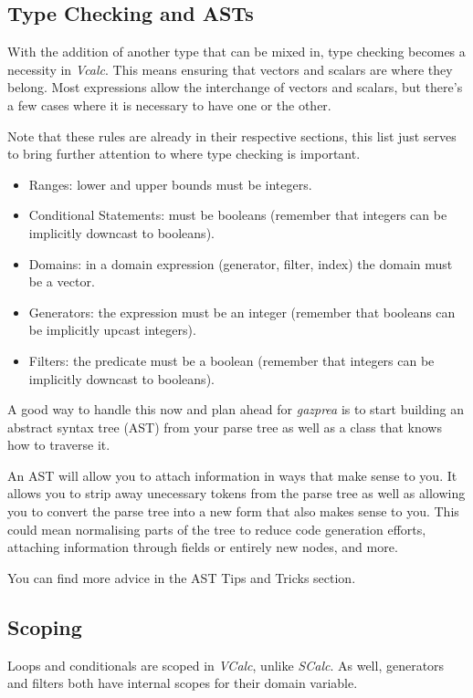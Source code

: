 \documentclass{article}
\begin{document}
\subsection{Type Checking and ASTs}
With the addition of another type that can be mixed in, type checking becomes a necessity in
\textit{Vcalc}. This means ensuring that vectors and scalars are where they belong. Most expressions
allow the interchange of vectors and scalars, but there's a few cases where it is necessary to have
one or the other.

Note that these rules are already in their respective sections, this list just serves to bring
further attention to where type checking is important.

\begin{itemize}
  \item
    Ranges: lower and upper bounds must be integers.
  \item
    Conditional Statements: must be booleans (remember that integers can be implicitly downcast to
    booleans).
  \item
    Domains: in a domain expression (generator, filter, index) the domain must be a vector.
  \item
    Generators: the expression must be an integer (remember that booleans can be implicitly upcast
    integers).
  \item
    Filters: the predicate must be a boolean (remember that integers can be implicitly downcast to
    booleans).
\end{itemize}

A good way to handle this now and plan ahead for \textit{gazprea} is to start building an abstract
syntax tree (AST) from your parse tree as well as a class that knows how to traverse it.

An AST will allow you to attach information in ways that make sense to you. It allows you to strip
away unecessary tokens from the parse tree as well as allowing you to convert the parse tree into a
new form that also makes sense to you. This could mean normalising parts of the tree to reduce code
generation efforts, attaching information through fields or entirely new nodes, and more.

You can find more advice in the AST Tips and Tricks section.

\subsection{Scoping}
Loops and conditionals are scoped in \textit{VCalc}, unlike \textit{SCalc}. As well, generators and
filters both have internal scopes for their domain variable.
\end{document}
